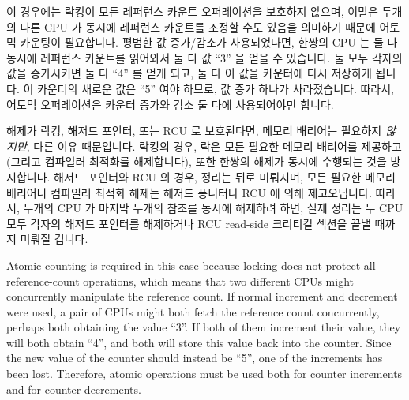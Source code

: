 \iffalse

Simple atomic counting may be used in cases where any CPU acquiring
a reference must already hold a reference.
This style is used when a single CPU creates an object for its own private
use, but must allow for accesses from other CPUs, tasks, timer handlers,
and so on.
Any CPU that hands the object off must first acquire a new reference on
behalf of the recipient on the one hand, or refrain from further accesses
after the handoff on the other.
In the Linux kernel, the \co{kref} primitives are used to implement
this style of reference counting, as shown in
\cref{lst:together:Linux Kernel kref API}.\footnote{
	As of Linux v4.10.
	Linux v4.11 introduced a \co{refcount_t} API that improves
	efficiency weakly ordered platforms, but which is functionally
	equivalent to the \co{atomic_t} that it replaced.}

\fi

이 경우에는 락킹이 모든 레퍼런스 카운트 오퍼레이션을 보호하지 않으며, 이말은
두개의 다른 CPU 가 동시에 레퍼런스 카운트를 조정할 수도 있음을 의미하기 때문에
어토믹 카운팅이 필요합니다.
평범한 값 증가/감소가 사용되었다면, 한쌍의 CPU 는 둘 다 동시에 레퍼런스
카운트를 읽어와서 둘 다 값 ``3'' 을 얻을 수 있습니다.
둘 모두 각자의 값을 증가시키면 둘 다 ``4'' 를 얻게 되고, 둘 다 이 값을 카운터에
다시 저장하게 됩니다.
이 카운터의 새로운 값은 ``5'' 여야 하므로, 값 증가 하나가 사라졌습니다.
따라서, 어토믹 오퍼레이션은 카운터 증가와 감소 둘 다에 사용되어야만 합니다.

해제가 락킹, 해저드 포인터, 또는 RCU 로 보호된다면, 메모리 배리어는 필요하지
\emph{않지만}, 다른 이유 때문입니다.
락킹의 경우, 락은 모든 필요한 메모리 배리어를 제공하고 (그리고 컴파일러
최적화를 해제합니다), 또한 한쌍의 해제가 동시에 수행되는 것을 방지합니다.
해저드 포인터와 RCU 의 경우, 정리는 뒤로 미뤄지며, 모든 필요한 메모리 배리어나
컴파일러 최적화 해제는 해저드 퐁니터나 RCU 에 의해 제고오딥니다.
따라서, 두개의 CPU 가 마지막 두개의 참조를 동시에 해제하려 하면, 실제 정리는 두
CPU 모두 각자의 해저드 포인터를 해제하거나 RCU read-side 크리티컬 섹션을 끝낼
때까지 미뤄질 겁니다.

\iffalse

Atomic counting is required in this case because locking does not protect
all reference-count operations, which means that two different CPUs
might concurrently manipulate the reference count.
If normal increment and decrement were used, a pair of CPUs might both
fetch the reference count concurrently, perhaps both obtaining
the value ``3''.
If both of them increment their value, they will both obtain ``4'',
and both will store this value back into the counter.
Since the new value of the counter should instead be ``5'', one
of the increments has been lost.
Therefore, atomic operations must be used both for counter increments
and for counter decrements.

